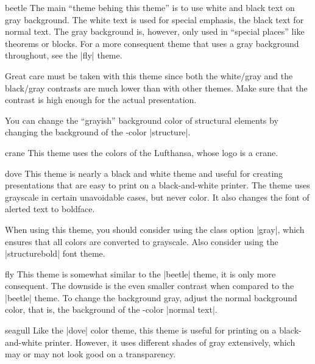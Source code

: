 \begin{colorthemeexample}{beetle}
  The main ``theme behing this theme'' is to use white and black text
  on gray background. The white text is used for special emphasis, the
  black text for normal text. The gray background is, however, only
  used in ``special places'' like theorems or blocks. For a  more
  consequent theme that uses a gray background throughout, see the
  |fly| theme.

  Great care must be taken with this theme since both the white/gray
  and the black/gray contrasts are much lower than with other
  themes. Make sure that the contrast is high enough for the actual
  presentation.

  You can change the ``grayish'' background color of structural
  elements by changing the background of the \beamer-color |structure|.
\end{colorthemeexample}



\begin{colorthemeexample}{crane}
  This theme uses the colors of the Lufthansa, whose logo is a crane.
\end{colorthemeexample}



\begin{colorthemeexample}{dove}
  This theme is nearly a black and white theme and useful for creating
  presentations that are easy to print on a black-and-white
  printer. The theme uses grayscale in certain unavoidable cases, but
  never color. It also changes the font of alerted text to boldface.

  When using this theme, you should consider using the class option
  |gray|, which ensures that all colors are converted to
  grayscale. Also consider using the |structurebold| font theme.
\end{colorthemeexample}


\begin{colorthemeexample}{fly}
  This theme is somewhat similar to the |beetle| theme, it is only
  more consequent. The downside is the even smaller contrast when
  compared to the |beetle| theme. To change the background gray,
  adjust the normal background color, that is, the background of the
  \beamer-color |normal text|.
\end{colorthemeexample}



\begin{colorthemeexample}{seagull}
  Like the |dove| color theme, this theme is useful for printing on a
  black-and-white printer. However, it uses different shades of gray
  extensively, which may or may not look good on a transparency.
\end{colorthemeexample}



